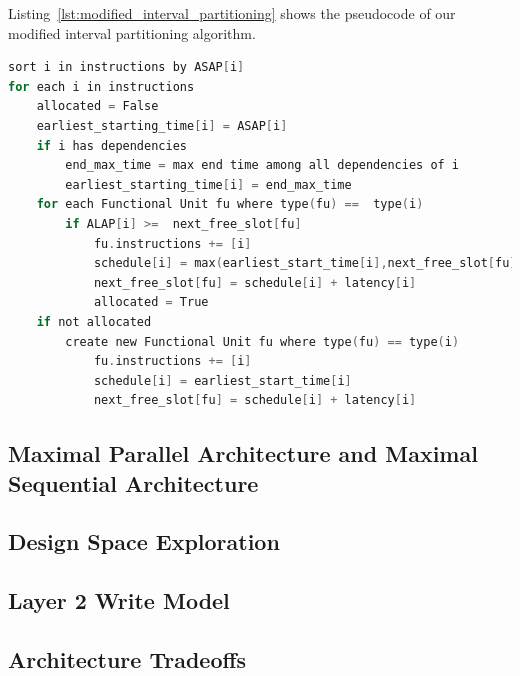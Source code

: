 Listing~\ref{lst:modified_interval_partitioning} shows the pseudocode of our modified interval partitioning algorithm.
\begin{lstlisting}[language=C, caption={Example of input configuration file}, label={lst:modified_interval_partitioning}]
sort i in instructions by ASAP[i]
for each i in instructions
	allocated = False
	earliest_starting_time[i] = ASAP[i]
	if i has dependencies
		end_max_time = max end time among all dependencies of i
		earliest_starting_time[i] = end_max_time
	for each Functional Unit fu where type(fu) ==  type(i)
		if ALAP[i] >=  next_free_slot[fu]
			fu.instructions += [i]
			schedule[i] = max(earliest_start_time[i],next_free_slot[fu])
			next_free_slot[fu] = schedule[i] + latency[i]
			allocated = True
	if not allocated
		create new Functional Unit fu where type(fu) == type(i)
			fu.instructions += [i]
			schedule[i] = earliest_start_time[i]
			next_free_slot[fu] = schedule[i] + latency[i]

\end{lstlisting}

\subsection{Maximal Parallel Architecture and Maximal Sequential Architecture}
\subsection{Design Space Exploration}
\subsection{Layer 2 Write Model}
\subsection{Architecture Tradeoffs}

